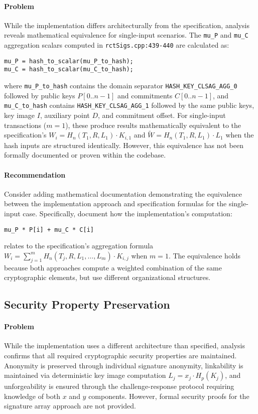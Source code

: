 \documentclass{article}
\begin{document}
\paragraph{Problem}
While the implementation differs architecturally from the specification, 
analysis reveals mathematical equivalence for single-input scenarios.  
The \texttt{mu\_P} and \texttt{mu\_C} aggregation scalars computed in 
\texttt{rctSigs.cpp:439-440} are calculated as:
\begin{verbatim}
mu_P = hash_to_scalar(mu_P_to_hash);
mu_C = hash_to_scalar(mu_C_to_hash);
\end{verbatim}
where \texttt{mu\_P\_to\_hash} contains the domain separator \texttt{HASH\_KEY\_CLSAG\_AGG\_0} 
followed by public keys $P[0..n-1]$ and commitments $C[0..n-1]$, and \texttt{mu\_C\_to\_hash} 
contains \texttt{HASH\_KEY\_CLSAG\_AGG\_1} followed by the same public keys, key image $I$, 
auxiliary point $D$, and commitment offset.  For single-input transactions ($m=1$), 
these produce results mathematically equivalent to the specification's 
$W_i = H_n(T_1, R, L_1) \cdot K_{i,1}$ and $\tilde{W} = H_n(T_1, R, L_1) \cdot L_1$ 
when the hash inputs are structured identically. However, this equivalence has not 
been formally documented or proven within the codebase.

\paragraph{Recommendation}
Consider adding mathematical documentation demonstrating the equivalence 
between the implementation approach and specification formulas for the 
single-input case.  Specifically, document how the implementation's computation:
\begin{verbatim}
mu_P * P[i] + mu_C * C[i]
\end{verbatim}
relates to the specification's aggregation formula $W_i = \sum_{j=1}^{m} H_n(T_j, R, L_1, \ldots, L_m) \cdot K_{i,j}$ 
when $m=1$.  The equivalence holds because both approaches compute a weighted combination 
of the same cryptographic elements, but use different organizational structures.

\subsection{Security Property Preservation}
\paragraph{Problem}
While the implementation uses a different architecture than specified, 
analysis confirms that all required cryptographic security properties are 
maintained.  Anonymity is preserved through individual signature anonymity, 
linkability is maintained via deterministic key image computation 
$L_j = x_j \cdot H_p(K_j)$, and unforgeability is ensured through the 
challenge-response protocol requiring knowledge of both $x$ and $y$ 
components.  However, formal security proofs for the signature array 
approach are not provided.
\end{document}
